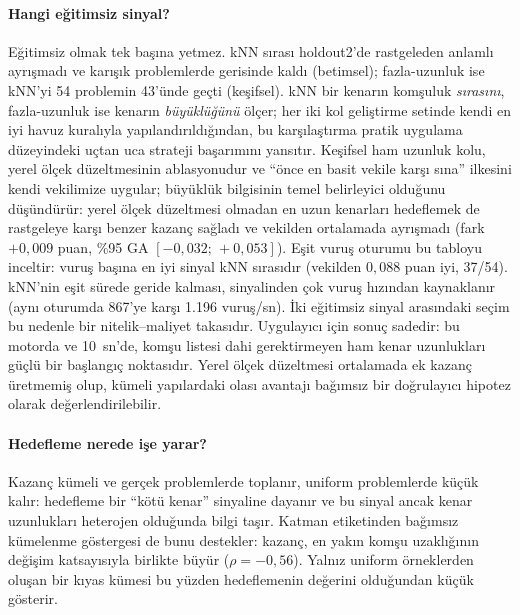 \paragraph{Hangi eğitimsiz sinyal?}
Eğitimsiz olmak tek başına yetmez. kNN sırası holdout2'de rastgeleden anlamlı ayrışmadı ve karışık
problemlerde gerisinde kaldı (betimsel); fazla-uzunluk ise kNN'yi 54 problemin 43'ünde geçti
(keşifsel).
kNN bir kenarın komşuluk \emph{sırasını}, fazla-uzunluk ise kenarın \emph{büyüklüğünü} ölçer;
her iki kol geliştirme setinde kendi en iyi havuz kuralıyla yapılandırıldığından, bu karşılaştırma
pratik uygulama düzeyindeki uçtan uca strateji başarımını yansıtır.
Keşifsel ham uzunluk kolu, yerel ölçek düzeltmesinin ablasyonudur ve ``önce en basit vekile karşı sına'' ilkesini kendi vekilimize uygular;
büyüklük bilgisinin temel belirleyici olduğunu düşündürür: yerel ölçek düzeltmesi olmadan en uzun
kenarları hedeflemek de rastgeleye karşı benzer kazanç sağladı ve vekilden ortalamada ayrışmadı
(fark $+0{,}009$ puan, \%95 GA $[-0{,}032;\,+0{,}053]$).
Eşit vuruş oturumu bu tabloyu inceltir: vuruş başına en iyi sinyal kNN sırasıdır (vekilden
$0{,}088$ puan iyi, 37/54). kNN'nin eşit sürede geride kalması, sinyalinden çok vuruş hızından
kaynaklanır (aynı oturumda 867'ye karşı 1.196 vuruş/sn). İki eğitimsiz sinyal arasındaki seçim bu
nedenle bir nitelik--maliyet takasıdır.
Uygulayıcı için sonuç sadedir: bu motorda ve 10~sn'de, komşu listesi dahi gerektirmeyen ham kenar
uzunlukları güçlü bir başlangıç noktasıdır. Yerel ölçek düzeltmesi ortalamada ek kazanç üretmemiş
olup, kümeli yapılardaki olası avantajı bağımsız bir doğrulayıcı hipotez olarak değerlendirilebilir.

\paragraph{Hedefleme nerede işe yarar?}
Kazanç kümeli ve gerçek problemlerde toplanır, uniform problemlerde küçük kalır: hedefleme bir
``kötü kenar'' sinyaline dayanır ve bu sinyal ancak kenar uzunlukları heterojen olduğunda bilgi
taşır. Katman etiketinden bağımsız kümelenme göstergesi de bunu destekler: kazanç, en yakın komşu
uzaklığının değişim katsayısıyla birlikte büyür ($\rho=-0{,}56$).
Yalnız uniform örneklerden oluşan bir kıyas kümesi bu yüzden hedeflemenin değerini
olduğundan küçük gösterir.

